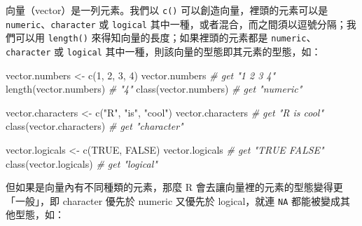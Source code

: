 \documentclass[
]{book}
\newenvironment{Shaded}{\begin{snugshade}}{\end{snugshade}}
\newcommand{\CommentTok}[1]{\textcolor[rgb]{0.56,0.35,0.01}{\textit{#1}}}
\newcommand{\ConstantTok}[1]{\textcolor[rgb]{0.00,0.00,0.00}{#1}}
\newcommand{\DecValTok}[1]{\textcolor[rgb]{0.00,0.00,0.81}{#1}}
\newcommand{\FunctionTok}[1]{\textcolor[rgb]{0.00,0.00,0.00}{#1}}
\newcommand{\NormalTok}[1]{#1}
\newcommand{\OtherTok}[1]{\textcolor[rgb]{0.56,0.35,0.01}{#1}}
\newcommand{\StringTok}[1]{\textcolor[rgb]{0.31,0.60,0.02}{#1}}
\theoremstyle{definition}
\theoremstyle{remark}
\begin{document}
向量（vector）是一列元素。我們以 \texttt{c()} 可以創造向量，裡頭的元素可以是 \texttt{numeric}、\texttt{character} 或 \texttt{logical} 其中一種，或者混合，而之間須以逗號分隔；我們可以用 \texttt{length()} 來得知向量的長度；如果裡頭的元素都是 \texttt{numeric}、\texttt{character} 或 \texttt{logical} 其中一種，則該向量的型態即其元素的型態，如：

\begin{Shaded}
\begin{Highlighting}[]
\NormalTok{vector.numbers }\OtherTok{\textless{}{-}} \FunctionTok{c}\NormalTok{(}\DecValTok{1}\NormalTok{, }\DecValTok{2}\NormalTok{, }\DecValTok{3}\NormalTok{, }\DecValTok{4}\NormalTok{)}
\NormalTok{vector.numbers  }\CommentTok{\# get "1 2 3 4"}
\FunctionTok{length}\NormalTok{(vector.numbers)  }\CommentTok{\# "4"}
\FunctionTok{class}\NormalTok{(vector.numbers)  }\CommentTok{\# get "\textquotesingle{}numeric\textquotesingle{}"}

\NormalTok{vector.characters }\OtherTok{\textless{}{-}} \FunctionTok{c}\NormalTok{(}\StringTok{"R"}\NormalTok{, }\StringTok{"is"}\NormalTok{, }\StringTok{"cool"}\NormalTok{) }
\NormalTok{vector.characters  }\CommentTok{\# get "\textquotesingle{}R\textquotesingle{}    \textquotesingle{}is\textquotesingle{}   \textquotesingle{}cool\textquotesingle{}"}
\FunctionTok{class}\NormalTok{(vector.characters)  }\CommentTok{\# get "\textquotesingle{}character\textquotesingle{}"}

\NormalTok{vector.logicals }\OtherTok{\textless{}{-}} \FunctionTok{c}\NormalTok{(}\ConstantTok{TRUE}\NormalTok{, }\ConstantTok{FALSE}\NormalTok{)}
\NormalTok{vector.logicals  }\CommentTok{\# get "TRUE FALSE"}
\FunctionTok{class}\NormalTok{(vector.logicals)  }\CommentTok{\# get "\textquotesingle{}logical\textquotesingle{}"}
\end{Highlighting}
\end{Shaded}

但如果是向量內有不同種類的元素，那麼 R 會去讓向量裡的元素的型態變得更「一般」，即 character 優先於 numeric 又優先於 logical，就連 \texttt{NA} 都能被變成其他型態，如：
\end{document}

